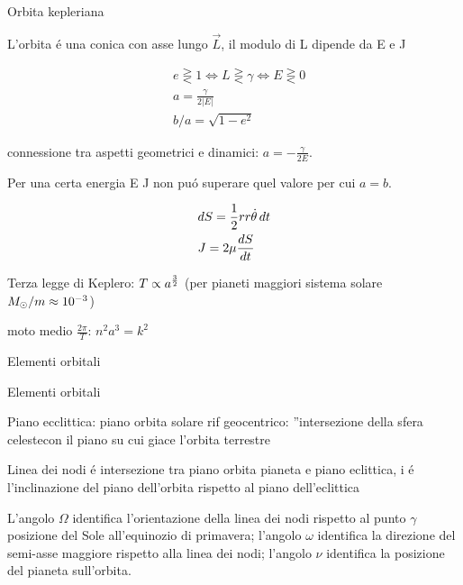 \begin{wordonframe}{Orbita kepleriana}

L'orbita \'e una conica con asse lungo $\vec{L}$, il modulo di L dipende da E e J

\begin{align*}
&e\gtreqless1\Leftrightarrow L\gtreqless\gamma\Leftrightarrow E\gtreqless0\\
&a=\frac{\gamma}{2|E|}\\
&b/a=\sqrt{1-e^2}
\end{align*}

connessione tra aspetti geometrici e dinamici: $a=-\frac{\gamma}{2E}$.

Per una certa energia E J non pu\'o superare quel valore per cui $a=b$.

\begin{align*}
&dS=\frac{1}{2}rr\dot{\theta}\,dt\\
&J=2\mu\TDy{t}{S}
\end{align*}

Terza legge di Keplero: $T\propto a\expy{\frac{3}{2}}$ (per pianeti maggiori sistema solare $\msun{}/m\approx\num{e-3}$)

moto medio $\frac{2\pi}{T}$: $n^2a^3=k^2$

\end{wordonframe}


\begin{frame}{Elementi orbitali}



\end{frame}



\begin{wordonframe}{Elementi orbitali}

Piano ecclittica: piano orbita solare rif geocentrico: ''intersezione della sfera celestecon il piano su cui giace l'orbita terrestre

Linea dei nodi \'e intersezione tra piano orbita pianeta e piano eclittica, i \'e l'inclinazione del piano dell'orbita rispetto al piano dell'eclittica

L'angolo $\Omega$ identifica l'orientazione della linea dei nodi rispetto al punto $\gamma$ posizione del Sole all'equinozio di primavera; l'angolo $\omega$ identifica la direzione del semi-asse maggiore rispetto alla linea dei nodi; l'angolo $\nu$ identifica la posizione del pianeta sull'orbita.

\end{wordonframe}


